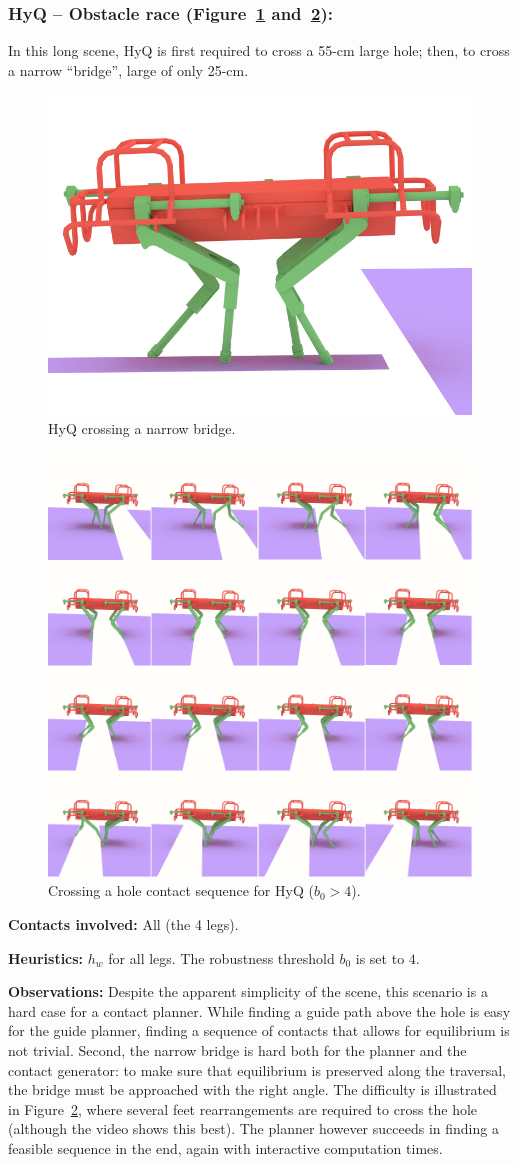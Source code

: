 \subsubsection{HyQ -- Obstacle race (Figure~\ref{fig:HyQ_bridge} and~\ref{fig:HyQ_obs}):}
In this long scene, HyQ is first required to cross a 55-cm large hole; then, to cross a narrow ``bridge'', large of only 25-cm.

\begin{figure}
  \centering
  \includegraphics[width=0.4\linewidth]{figures/HyQ_bridge}
  \caption{
           HyQ crossing a narrow bridge. }
		   \label{fig:HyQ_bridge}
\end{figure}

\begin{figure}
  \centering
  \includegraphics[width=0.5\linewidth]{figures/HyQ_obs}
  \caption{
           Crossing a hole contact sequence for HyQ ($b_0 > 4$). }
		   \label{fig:HyQ_obs}
\end{figure}



\noindent\textbf{Contacts involved:} All (the 4 legs).

\noindent\textbf{Heuristics:} $h_w$ for all legs. The robustness threshold $b_0$ is set to $4$.

\noindent\textbf{Observations:} Despite the apparent simplicity of the scene, this scenario is a hard case for a contact planner.
While finding a guide path above the hole is easy for the guide planner, finding a sequence of contacts that allows for equilibrium is not trivial.
Second, the narrow bridge is hard both for the planner and the contact generator: to make sure that equilibrium is preserved along the traversal,
the bridge must be approached with the right angle.
The difficulty is illustrated in Figure~\ref{fig:HyQ_obs}, where several feet rearrangements are required to cross the hole (although the video shows this best).
The planner however succeeds in finding a feasible sequence in the end, again with \gls{interactive} computation times.

